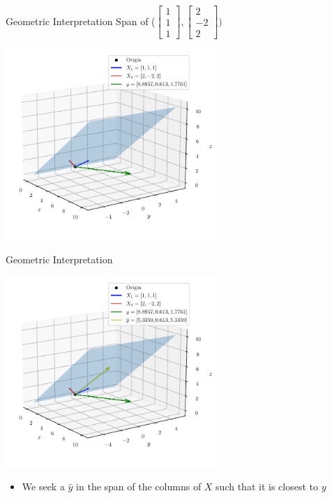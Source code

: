 \documentclass{beamer}
\begin{document}
\begin{frame}{Geometric Interpretation}
Span of ($\begin{bmatrix}
1 \\1\\1
\end{bmatrix}, \begin{bmatrix}
2 \\-2\\2
\end{bmatrix}) $


\includegraphics[width=0.6\textwidth]{../figures/linear-regression/geometric-2.pdf}

\end{frame}


\begin{frame}{Geometric Interpretation}	

    \includegraphics[width=0.6\textwidth]{../figures/linear-regression/geometric-3.pdf}

    


\begin{itemize}[<+->]
\item We seek a $\hat{y}$ in the span of the columns of $X$ such that it is closest to $y$
\end{itemize}

\end{frame}
\end{document}
